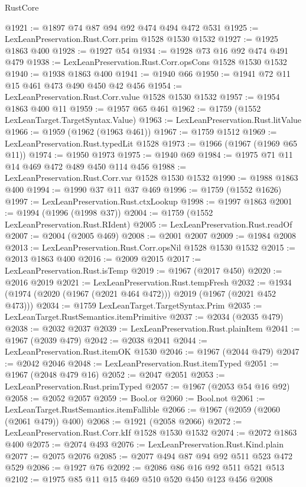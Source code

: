\begin{lexlean}{RustCore}
\begin{coremodule}
@1921 := @1897 @74 @87 @94 @92 @474 @494 @472 @531
@1925 := LexLeanPreservation.Rust.Corr.prim @1528 @1530 @1532
@1927 := @1925 @1863 @400
@1928 := @1927 @54
@1934 := @1928 @73 @16 @92 @474 @491 @479
@1938 := LexLeanPreservation.Rust.Corr.opsCons @1528 @1530 @1532
@1940 := @1938 @1863 @400
@1941 := @1940 @66
@1950 := @1941 @72 @11 @15 @461 @473 @490 @450 @42 @456
@1954 := LexLeanPreservation.Rust.Corr.value @1528 @1530 @1532
@1957 := @1954 @1863 @400 @11
@1959 := @1957 @65 @461
@1962 := @1759 (@1552 LexLeanTarget.TargetSyntax.Value)
@1963 := LexLeanPreservation.Rust.litValue
@1966 := @1959 (@1962 (@1963 @461))
@1967 := @1759 @1512
@1969 := LexLeanPreservation.Rust.typedLit @1528
@1973 := @1966 (@1967 (@1969 @65 @11))
@1974 := @1950 @1973
@1975 := @1940 @69
@1984 := @1975 @71 @11 @14 @469 @472 @489 @450 @114 @456
@1988 := LexLeanPreservation.Rust.Corr.var @1528 @1530 @1532
@1990 := @1988 @1863 @400
@1994 := @1990 @37 @11 @37 @469
@1996 := @1759 (@1552 @1626)
@1997 := LexLeanPreservation.Rust.ctxLookup
@1998 := @1997 @1863
@2001 := @1994 (@1996 (@1998 @37))
@2004 := @1759 (@1552 LexLeanPreservation.Rust.RIdent)
@2005 := LexLeanPreservation.Rust.readOf
@2007 := @2004 (@2005 @469)
@2008 := @2001 @2007
@2009 := @1984 @2008
@2013 := LexLeanPreservation.Rust.Corr.opsNil @1528 @1530 @1532
@2015 := @2013 @1863 @400
@2016 := @2009 @2015
@2017 := LexLeanPreservation.Rust.isTemp
@2019 := @1967 (@2017 @450)
@2020 := @2016 @2019
@2021 := LexLeanPreservation.Rust.tempFresh
@2032 := @1934 (@1974 (@2020 (@1967 (@2021 @464 @472))) @2019 (@1967 (@2021 @452 @473)))
@2034 := @1759 LexLeanTarget.TargetSyntax.Prim
@2035 := LexLeanTarget.RustSemantics.itemPrimitive
@2037 := @2034 (@2035 @479)
@2038 := @2032 @2037
@2039 := LexLeanPreservation.Rust.plainItem
@2041 := @1967 (@2039 @479)
@2042 := @2038 @2041
@2044 := LexLeanPreservation.Rust.itemOK @1530
@2046 := @1967 (@2044 @479)
@2047 := @2042 @2046
@2048 := LexLeanPreservation.Rust.itemTyped
@2051 := @1967 (@2048 @479 @16)
@2052 := @2047 @2051
@2053 := LexLeanPreservation.Rust.primTyped
@2057 := @1967 (@2053 @54 @16 @92)
@2058 := @2052 @2057
@2059 := Bool.or
@2060 := Bool.not
@2061 := LexLeanTarget.RustSemantics.itemFallible
@2066 := @1967 (@2059 (@2060 (@2061 @479)) @400)
@2068 := @1921 (@2058 @2066)
@2072 := LexLeanPreservation.Rust.Corr.kIf @1528 @1530 @1532
@2074 := @2072 @1863 @400
@2075 := @2074 @493
@2076 := LexLeanPreservation.Rust.Kind.plain
@2077 := @2075 @2076
@2085 := @2077 @494 @87 @94 @92 @511 @523 @472 @529
@2086 := @1927 @76
@2092 := @2086 @86 @16 @92 @511 @521 @513
@2102 := @1975 @85 @11 @15 @469 @510 @520 @450 @123 @456 @2008

\end{coremodule}
\end{lexlean}

